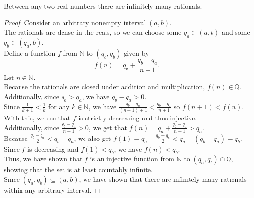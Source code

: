 \documentclass{article}
\newenvironment{theorem}[1]{\renewcommand\theinnercustomthm{#1}\innercustomthm}
  {\endinnercustomthm}
\begin{document}
\begin{theorem}{6}
Between any two real numbers there are infinitely many rationals.
\end{theorem}
\begin{proof}
    Consider an arbitrary nonempty interval $(a,b)$. \\
    The rationals are dense in the reals, so we can choose some $q_a \in (a,b)$ and some $q_b \in (q_a, b)$. \\
    Define a function $f$ from $\mathbb N$ to $(q_a,q_b)$ given by
    \[f(n) = q_a + \frac{q_b - q_a}{n+1}.\]
    Let $n \in \mathbb N$. \\
    Because the rationals are closed under addition and multiplication, $f(n) \in \mathbb Q$. \\
    Additionally, since $q_b > q_a$, we have $q_b - q_a > 0$. \\
    Since $\frac{1}{k+1}<\frac{1}{k}$ for any $k \in \mathbb N$, we have $\frac{q_b - q_a}{(n+1)+1} < \frac{q_b - q_a}{n+1}$ so $f(n+1)<f(n)$. \\
    With this, we see that $f$ is strictly decreasing and thus injective. \\
    Additionally, since $\frac{q_b - q_a}{n+1} > 0$, we get that $f(n) = q_a +\frac{q_b - q_a}{n+1} > q_a$. \\
    Because $\frac{q_b - q_a}{2} < q_b - q_a$, we also get $f(1) = q_a + \frac{q_b-q_a}{2} < q_a + (q_b - q_a) = q_b$. \\
    Since $f$ is decreasing and $f(1) < q_b$, we have $f(n) < q_b$. \\
    Thus, we have shown that $f$ is an injective function from $\mathbb N$ to $(q_a,q_b)\cap \mathbb Q$, showing that the set is at least countably infinite. \\
    Since $(q_a, q_b) \subseteq (a,b)$, we have shown that there are infinitely many rationals within any arbitrary interval.
\end{proof}
\end{document}
